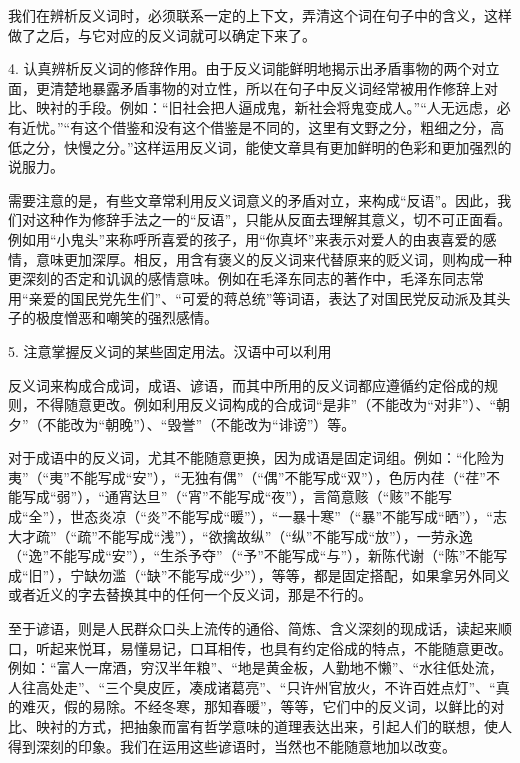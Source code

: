 我们在辨析反义词时，必须联系一定的上下文，弄清这个词在句子中的含义，这样做了之后，与它对应的反义词就可以确定下来了。

4. 认真辨析反义词的修辞作用。由于反义词能鲜明地揭示出矛盾事物的两个对立面，更清楚地暴露矛盾事物的对立性，所以在句子中反义词经常被用作修辞上对比、映衬的手段。例如：“旧社会把人逼成鬼，新社会将鬼变成人。”“人无远虑，必有近忧。”“有这个借鉴和没有这个借鉴是不同的，这里有文野之分，粗细之分，高低之分，快慢之分。”这样运用反义词，能使文章具有更加鲜明的色彩和更加强烈的说服力。
\newpage

需要注意的是，有些文章常利用反义词意义的矛盾对立，来构成“反语”。因此，我们对这种作为修辞手法之一的“反语”，只能从反面去理解其意义，切不可正面看。例如用“小鬼头”来称呼所喜爱的孩子，用“你真坏”来表示对爱人的由衷喜爱的感情，意味更加深厚。相反，用含有褒义的反义词来代替原来的贬义词，则构成一种更深刻的否定和讥讽的感情意味。例如在毛泽东同志的著作中，毛泽东同志常用“亲爱的国民党先生们”、“可爱的蒋总统”等词语，表达了对国民党反动派及其头子的极度憎恶和嘲笑的强烈感情。

5. 注意掌握反义词的某些固定用法。汉语中可以利用

反义词来构成合成词，成语、谚语，而其中所用的反义词都应遵循约定俗成的规则，不得随意更改。例如利用反义词构成的合成词“是非”（不能改为“对非”）、“朝夕”（不能改为“朝晚”）、“毁誉”（不能改为“诽谤”）等。

对于成语中的反义词，尤其不能随意更换，因为成语是固定词组。例如：“化险为夷”（“夷”不能写成“安”），“无独有偶”（“偶”不能写成“双”），色厉内荏（“荏”不能写成“弱”），“通宵达旦”（“宵”不能写成“夜”），言简意赅（“赅”不能写成“全”），世态炎凉（“炎”不能写成“暖”），“一暴十寒”（“暴”不能写成“晒”），“志大才疏”（“疏”不能写成“浅”），“欲擒故纵”（“纵”不能写成“放”），一劳永逸（“逸”不能写成“安”），“生杀予夺”（“予”不能写成“与”），新陈代谢（“陈”不能写成“旧”），宁缺勿滥（“缺”不能写成“少”），等等，都是固定搭配，如果拿另外同义或者近义的字去替换其中的任何一个反义词，那是不行的。
\newpage

至于谚语，则是人民群众口头上流传的通俗、简炼、含义深刻的现成话，读起来顺口，听起来悦耳，易懂易记，口耳相传，也具有约定俗成的特点，不能随意更改。例如：“富人一席酒，穷汉半年粮”、“地是黄金板，人勤地不懒”、“水往低处流，人往高处走”、“三个臭皮匠，凑成诸葛亮”、“只许州官放火，不许百姓点灯”、“真的难灭，假的易除。不经冬寒，那知春暖”，等等，它们中的反义词，以鲜比的对比、映衬的方式，把抽象而富有哲学意味的道理表达出来，引起人们的联想，使人得到深刻的印象。我们在运用这些谚语时，当然也不能随意地加以改变。
\newpage